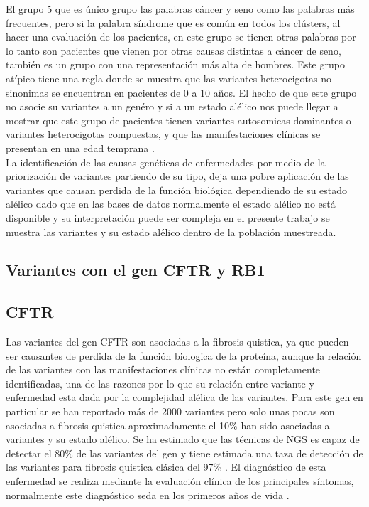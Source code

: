 El grupo 5 que es único grupo las palabras cáncer y seno como las palabras más frecuentes, pero si la palabra síndrome que es común en todos los clústers, al hacer una evaluación de los pacientes, en este grupo se tienen otras palabras por lo tanto son pacientes que vienen por otras causas distintas a cáncer de seno, también es un grupo con una representación más alta de hombres. Este grupo atípico tiene una regla donde se muestra que las variantes heterocigotas no sinonimas se encuentran  en pacientes de 0 a 10 años. El hecho de que este grupo no asocie su variantes a un genéro y si a un estado alélico nos puede llegar a mostrar que este grupo de pacientes tienen variantes autosomicas dominantes o variantes heterocigotas compuestas, y que las manifestaciones clínicas se presentan en una edad temprana \cite{Kamphans2013}. \\

La identificación de las causas genéticas de enfermedades por medio de la priorización de variantes partiendo de su tipo, deja una pobre aplicación de las variantes que causan perdida de la función biológica dependiendo de su estado alélico \cite{Eilbeck2017} dado que en las bases de datos normalmente el estado alélico no está disponible y su interpretación puede ser compleja \cite{Stenson2017} en el presente trabajo se muestra las variantes y su estado alélico dentro de la población muestreada. 


\subsection{Variantes con el gen CFTR y RB1}

\subsection*{CFTR}

Las variantes del gen CFTR son asociadas a la fibrosis quistica, ya que pueden ser causantes de perdida de la función biologica de la proteína, aunque la relación de las variantes con las manifestaciones clínicas no están completamente identificadas, una de las razones por lo que su relación entre variante y enfermedad esta dada por la complejidad alélica de las variantes. Para este gen en particular se han reportado más de 2000 variantes pero solo unas pocas son asociadas a fibrosis quistica aproximadamente el 10\% han sido asociadas a variantes y su estado alélico. Se ha estimado que las técnicas de NGS es capaz de detectar el 80\% de las variantes del gen y tiene estimada una taza de detección de las variantes para fibrosis quistica clásica del 97\% \cite{Rowntree2003,Terlizzi2017b,Farrell2016}. El diagnóstico de esta enfermedad se realiza mediante la evaluación clínica de los principales síntomas, normalmente este diagnóstico seda en los primeros años de vida \cite{Terlizzi2017b}.\\

